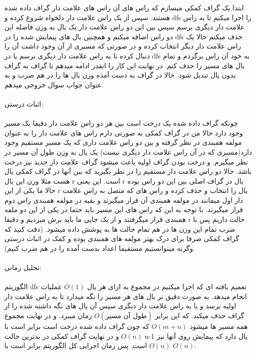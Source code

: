 \problem{}
ابتدا یک گراف کمکی میسازم که راس های آن راس های علامت دار گراف داده شده هستند.
سپس
از یک راس علامت دار دلخواه شروع کرده و dfs را اجرا میکنم تا به راس
علامت دار دیگری برسم
سپس بین این دو راس علامت دار یک یال به وزن فاصله این دو راس اضافه میکنم و همچنین یال های پیمایش شده را
در dfs حذف میکنم
حالا یک راس علامت دار دیگر انتخاب کرده
و در صورتی که مسیری از آن وجود داشت آن را دنبال کرده تا به راس 
علامت دار دیگری برسم یا در dfs به خود آن راس برگردم و تمام یال های مسیر
را حذف کنم.
در نهایت این کار را انقدر ادامه میدهم تا گراف به گراف بدون یال تبدیل شود.
حالا در گراف به دست آمده وزن یال ها را در هم ضرب و به عنوان جواب سوال خروجی میدهم.
\\\\
اثبات درستی:\\\\
چونکه گراف داده شده یک درخت است بین هر دو راس علامت دار دقیقا یک مسیر
وجود دارد حالا من در گراف کمکی به صورتی دارم راس های علامت دار را به عنوان مولفه
همبندی در نظر گرفته و بین دو راس علامت داری که یک مسیر مستقیم وجود دارد(مسیری که در آن راس علامت دار دیگری نیست)
یک یال به وزن طول آن مسیر در نظر میگیرم.
و درخت بودن گراف اولیه باعث میشود گراف
علامت دار جدید نیز درخت باشد.
حالا دو راس علامت دار مستقیم را در نظر بگیرید که بین آنها در گراف کمکی یال هست
مثلا وزن این یال r است.
این یعنی r یال در گراف اصلی بین این دو راس بوده
حالا ما یکی از این r یال را انتخاب و حذف کرده
و راس های که متصل به راس علامت دار اول میمانند
در مولفه همبندی آن قرار میگیرند و بقیه در مولفه همبندی
راس دوم قرار میگیرند.
با توجه به این که راس های این مسیر باید حتما در یکی از این دو ملفه همبندی قرار میگرفتند
و از یک جایی ما باید برش میزدیم و دقیقا r حالت داریم
پس با ضرب تمام این وزن ها در هم تمام حالت ها به پوشش داده میشود.
(دقت کنید که گراف کمکی صرفا برای درک بهتر مولفه های همبندی بوده و کمک در اثبات درستی وگرنه میتوانستیم
مستقیما اعداد بدست آمده را در هم ضرب کنیم).
\\\\
تحلیل زمانی:\\\\
الگوریتم dfs تعمیم یافته ای که اجرا میکنیم در مجموع
به ازای هر یال $O(1)$ عملیات انجام میدهد.
به صورت دقیق تر یال های هر مسیر را نگه میدارد تا به راس علامت دار اولیه برسد
و یا به راس علامت دار دیگری سپس آن یال های نگه داشته شده را از گراف حذف میکند.
که این برابر $O(\text{طول آن مسیر})$
زمان میبرد.
و در نهایت مجموع همه مسیر ها میشود $O(m+n)$
که چون گراف داده شده درخت است برابر است با 
$O(n)$ و در نهایت گراف کمکی در بدترین حالت n-1 یال دارد
که پیمایش روی آنها نیز $O(n)$ است.
 پس زمان اجرایی کل الگوریتم برابر است با $O(n)$.
